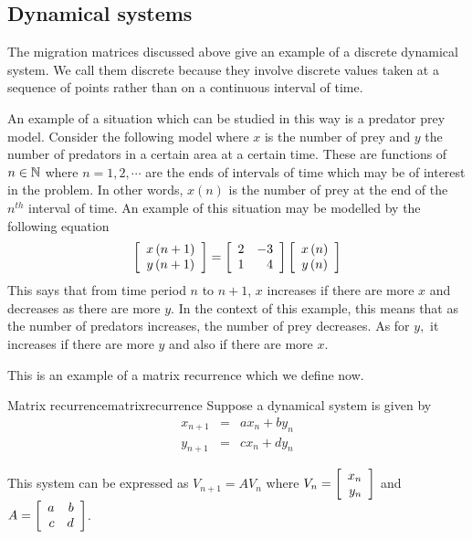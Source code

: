 \subsection{Dynamical systems}

The migration matrices discussed above give an example of a discrete
dynamical system. We call them discrete because they involve discrete values taken at a sequence of
points rather than on a continuous interval of time. 

An example of a situation
which can be studied in this way is a predator prey model. Consider the
following model where $x$ is the number of prey and $y$ the number of
predators in a certain area at a certain time. These are functions of $n\in \mathbb{N}$ where $n=1,2,\cdots $ are
the ends of intervals of time which may be of interest in the problem. In other words, $x \left( n \right)$ is the number 
of prey at the end of the $n^{th}$ interval of time.
An example of this situation may be modelled by the following equation
\begin{equation*}
\left[
\begin{array}{c}
x\left( n+1\right) \\
y\left( n+1\right)
\end{array}
\right] =\left[
\begin{array}{rr}
2 & -3 \\
1 & 4
\end{array}
\right] \left[
\begin{array}{c}
x\left( n\right) \\
y\left( n\right)
\end{array}
\right]
\end{equation*}
This says that from time period $n$ to $n+1$, $x$ increases if there are more $x$ and decreases as there
are more $y$. In the context of this example, this means that as the number of predators increases,
the number of prey decreases. As for $y,$ it increases if there are more $y$ and also if
there are more $x$.

This is an example of a matrix recurrence which we define now. 

\begin{definition}{Matrix recurrence}{matrixrecurrence}
Suppose a dynamical system is given by  
\begin{eqnarray*}
x_{n+1} &=& a x_n + b y_n \\
y_{n+1} &=& c x_n + d y_n
\end{eqnarray*}

This system can be expressed as $V_{n+1} = A V_{n}$ where $V_{n} = \left[ \begin{array}{r}
x_n \\
y_n
\end{array}
\right]$ and $A = \left[ \begin{array}{rr}
a & b \\
c & d 
\end{array} \right]$.  
\end{definition}

